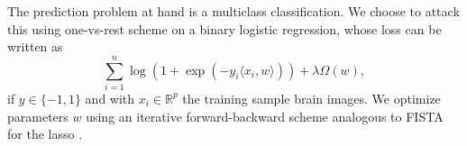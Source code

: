 \documentclass{article}
\DeclareMathOperator{\prox}{prox}
\DeclareMathOperator{\Id}{Id}
\newcommand{\R}{\mathbb{R}}
\begin{document}
The prediction problem at hand is a multiclass classification. We choose to
attack this using one-vs-rest scheme on a binary logistic regression, whose
loss can be written as
\[\sum_{i=1}^n\log(1 + \exp(-y_i\langle x_i, w\rangle)) + \lambda\Omega(w),\]
if \(y\in\{-1, 1\}\) and with \(x_i\in\R^p\) the training sample brain images.
We optimize parameters \(w\) using an iterative forward-backward
scheme analogous to FISTA for the lasso \cite{beck2009}.

\end{document}
